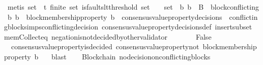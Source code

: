 \begin{isabellebody}
\ {\isacharparenleft}metis\ {\isacartoucheopen}{\isasymsigma}{\isacharunderscore}set\ {\isasymsubseteq}\ {\isasymSigma}t{\isacartoucheclose}\ {\isacartoucheopen}finite\ {\isasymsigma}{\isacharunderscore}set{\isacartoucheclose}\ {\isacartoucheopen}is{\isacharunderscore}faults{\isacharunderscore}lt{\isacharunderscore}threshold\ {\isacharparenleft}{\isasymUnion}{\isasymsigma}{\isacharunderscore}set{\isacharparenright}{\isacartoucheclose}\ {\isacartoucheopen}{\isacharbraceleft}{\isasymsigma}{\isacharcomma}\ {\isasymsigma}{\isacharprime}{\isacharbraceright}\ {\isasymsubseteq}\ {\isasymsigma}{\isacharunderscore}set\ {\isasymand}\ {\isacharbraceleft}b{}{\isacharcomma}\ b{}{\isacharbraceright}\ {\isasymsubseteq}\ B\ {\isasymand}\ block{\isacharunderscore}conflicting\ {\isacharparenleft}b{}{\isacharcomma}\ b{}{\isacharparenright}\ {\isasymand}\ block{\isacharunderscore}membership{\isacharunderscore}property\ b{}\ {\isasymin}\ consensus{\isacharunderscore}value{\isacharunderscore}property{\isacharunderscore}decisions\ {\isasymsigma}{\isacartoucheclose}\ conflicting{\isacharunderscore}blocks{\isacharunderscore}imps{\isacharunderscore}conflicting{\isacharunderscore}decision\ consensus{\isacharunderscore}value{\isacharunderscore}property{\isacharunderscore}decisions{\isacharunderscore}def\ insert{\isacharunderscore}subset\ mem{\isacharunderscore}Collect{\isacharunderscore}eq\ negation{\isacharunderscore}is{\isacharunderscore}not{\isacharunderscore}decided{\isacharunderscore}by{\isacharunderscore}other{\isacharunderscore}validator{\isacharparenright}\ \isanewline
\ \ \ \isamarkupfalse%
\ \isamarkupfalse%
\ False\isanewline
\ \ \ \ \ \isamarkupfalse%
\ {\isacartoucheopen}{\isasymnot}\ consensus{\isacharunderscore}value{\isacharunderscore}property{\isacharunderscore}is{\isacharunderscore}decided\ {\isacharparenleft}consensus{\isacharunderscore}value{\isacharunderscore}property{\isacharunderscore}not\ {\isacharparenleft}block{\isacharunderscore}membership{\isacharunderscore}property\ b{}{\isacharparenright}{\isacharcomma}\ {\isasymsigma}{\isacharprime}{\isacharparenright}{\isacartoucheclose}\ \isamarkupfalse%
\ blast\isanewline
\ \isamarkupfalse%
%
\endisatagproof
{\isafoldproof}%
%
\isadelimproof
\isanewline
%
\endisadelimproof
\isanewline
\isanewline
{}\isamarkupfalse%
\ {\isacharparenleft}\ Blockchain{\isacharparenright}\ no{\isacharunderscore}decision{\isacharunderscore}on{\isacharunderscore}conflicting{\isacharunderscore}blocks\ {\isacharcolon}\isanewline

\end{isabellebody}
